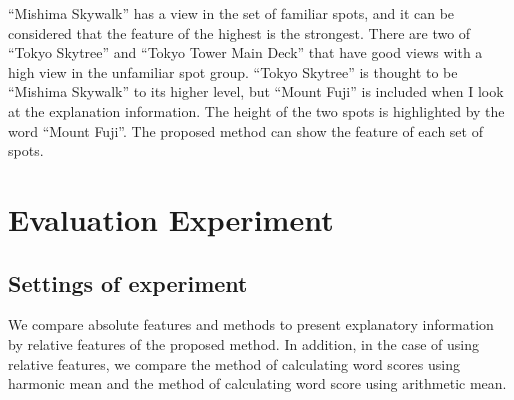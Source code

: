 \documentclass[journal]{IAENGtran}
\begin{document}
``Mishima Skywalk'' has a view in the set of familiar spots, and it can be considered that the feature of the highest is the strongest.
There are two of ``Tokyo Skytree'' and ``Tokyo Tower Main Deck'' that have good views with a high view in the unfamiliar spot group.
``Tokyo Skytree'' is thought to be ``Mishima Skywalk'' to its higher level, but ``Mount Fuji'' is included when I look at the explanation information.
The height of the two spots is highlighted by the word ``Mount Fuji''.
The proposed method can show the feature of each set of spots.



\section{Evaluation Experiment}
\label{sec:Evaluation Experiment}
\subsection{Settings of experiment}
\label{subsec:Settings of experiment}

We compare absolute features and methods to present explanatory information by relative features of the proposed method.
In addition, in the case of using relative features, we compare the method of calculating word scores using harmonic mean and the method of calculating word score using arithmetic mean.
\end{document}
